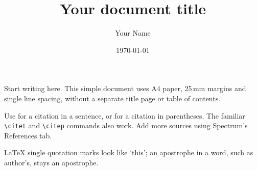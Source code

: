 \documentclass[11pt,a4paper]{article}
\title{Your document title}
\author{Your Name}
\date{\today}
\begin{document}
\maketitle

Start writing here. This simple document uses A4 paper, 25\,mm margins and single line spacing, without a separate title page or table of contents.

Use \textcite{Knuth1984} for a citation in a sentence, or \parencite{Knuth1984} for a citation in parentheses. The familiar \verb|\citet| and \verb|\citep| commands also work. Add more sources using Spectrum's References tab.

LaTeX single quotation marks look like `this'; an apostrophe in a word, such as author's, stays an apostrophe.

\printbibliography[title={References}]
\end{document}
